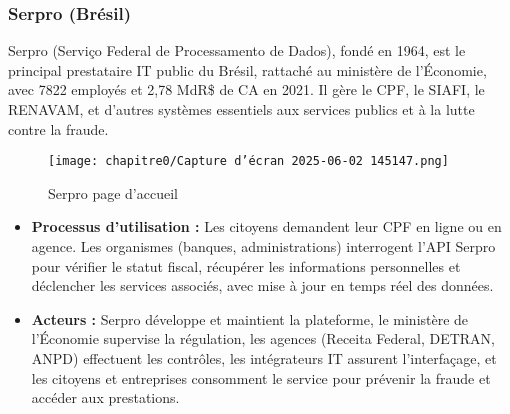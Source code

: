 \subsubsection{Serpro (Brésil)}
Serpro\cite{b5,b40} (Serviço Federal de Processamento de Dados), fondé en 1964, est le principal prestataire IT public du Brésil, rattaché au ministère de l’Économie, avec 7822 employés et 2{,}78 MdR\$ de CA en 2021\cite{b41}. Il gère le CPF, le SIAFI, le RENAVAM, et d’autres systèmes essentiels aux services publics et à la lutte contre la fraude\cite{b40}.\\
\begin{figure}[H]
  \centering
  \texttt{[image: chapitre0/Capture d'écran 2025-06-02 145147.png]}
  \caption{Serpro page d’accueil}
\end{figure}
\begin{itemize}[label=\textbullet]
  \item \textbf{Processus d'utilisation :} Les citoyens demandent leur CPF en ligne ou en agence. Les organismes (banques, administrations) interrogent l’API Serpro pour vérifier le statut fiscal, récupérer les informations personnelles et déclencher les services associés, avec mise à jour en temps réel des données.
  \item \textbf{Acteurs :} Serpro développe et maintient la plateforme, le ministère de l’Économie supervise la régulation, les agences (Receita Federal, DETRAN, ANPD) effectuent les contrôles, les intégrateurs IT assurent l’interfaçage, et les citoyens et entreprises consomment le service pour prévenir la fraude et accéder aux prestations.
\end{itemize}






